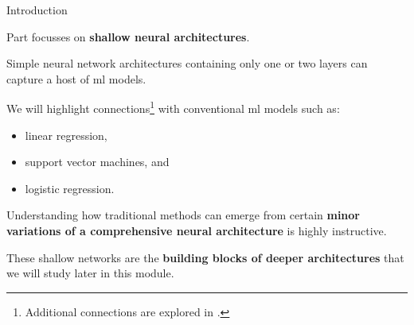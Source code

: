 
\begin{frame}[t]{Introduction}

Part \thispart focusses on {\bf shallow neural architectures}.\\
\vspace{0.2cm}

Simple neural network architectures containing only one or two layers 
can capture a host of \gls{ml} models.\\
\vspace{0.2cm}

We will highlight connections\footnote{
    Additional connections are explored in \cite{Aggarwal:2018SpringerDL}.
} with conventional
\gls{ml} models such as:
\begin{itemize}
    \item linear regression,
    \item support vector machines, and
    \item logistic regression.
\end{itemize}
\vspace{0.2cm}

Understanding how traditional methods can emerge from certain {\bf minor 
variations of a comprehensive neural architecture} is highly instructive.\\
\vspace{0.2cm}

These shallow networks are the {\bf building blocks of deeper architectures}
that we will study later in this module.\\

\end{frame}